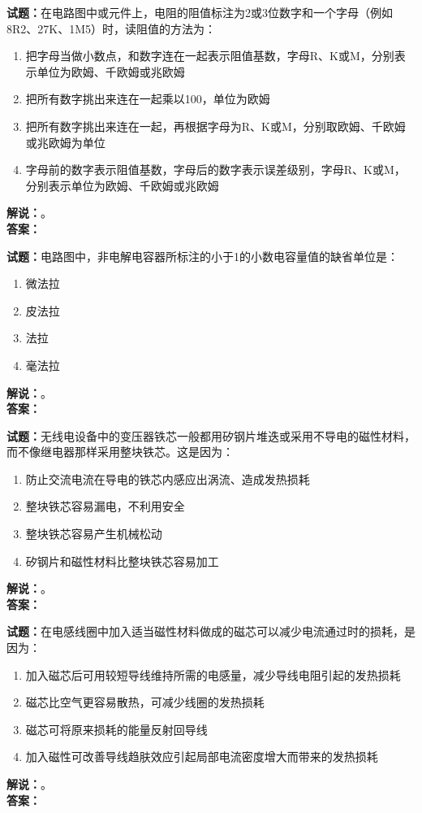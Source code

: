 \documentclass{ctexbook}
\begin{document}
\bigskip

\noindent\textbf{试题：}在电路图中或元件上，电阻的阻值标注为2或3位数字和一个字母（例如8R2、27K、1M5）时，读阻值的方法为：
\begin{enumerate}[leftmargin=3em]
  \item 把字母当做小数点，和数字连在一起表示阻值基数，字母R、K或M，分别表示单位为欧姆、千欧姆或兆欧姆
  \item 把所有数字挑出来连在一起乘以100，单位为欧姆
  \item 把所有数字挑出来连在一起，再根据字母为R、K或M，分别取欧姆、千欧姆或兆欧姆为单位
  \item 字母前的数字表示阻值基数，字母后的数字表示误差级别，字母R、K或M，分别表示单位为欧姆、千欧姆或兆欧姆
\end{enumerate}
\noindent\textbf{解说：}\textbf{}。\\\noindent\textbf{答案：}

\bigskip

\noindent\textbf{试题：}电路图中，非电解电容器所标注的小于1的小数电容量值的缺省单位是：
\begin{enumerate}[leftmargin=3em]
  \item 微法拉
  \item 皮法拉
  \item 法拉
  \item 毫法拉
\end{enumerate}
\noindent\textbf{解说：}\textbf{}。\\\noindent\textbf{答案：}

\bigskip

\noindent\textbf{试题：}无线电设备中的变压器铁芯一般都用矽钢片堆迭或采用不导电的磁性材料，而不像继电器那样采用整块铁芯。这是因为：
\begin{enumerate}[leftmargin=3em]
  \item 防止交流电流在导电的铁芯内感应出涡流、造成发热损耗
  \item 整块铁芯容易漏电，不利用安全
  \item 整块铁芯容易产生机械松动
  \item 矽钢片和磁性材料比整块铁芯容易加工
\end{enumerate}
\noindent\textbf{解说：}\textbf{}。\\\noindent\textbf{答案：}

\bigskip

\noindent\textbf{试题：}在电感线圈中加入适当磁性材料做成的磁芯可以减少电流通过时的损耗，是因为：
\begin{enumerate}[leftmargin=3em]
  \item 加入磁芯后可用较短导线维持所需的电感量，减少导线电阻引起的发热损耗
  \item 磁芯比空气更容易散热，可减少线圈的发热损耗
  \item 磁芯可将原来损耗的能量反射回导线
  \item 加入磁性可改善导线趋肤效应引起局部电流密度增大而带来的发热损耗
\end{enumerate}
\noindent\textbf{解说：}\textbf{}。\\\noindent\textbf{答案：}
\end{document}
